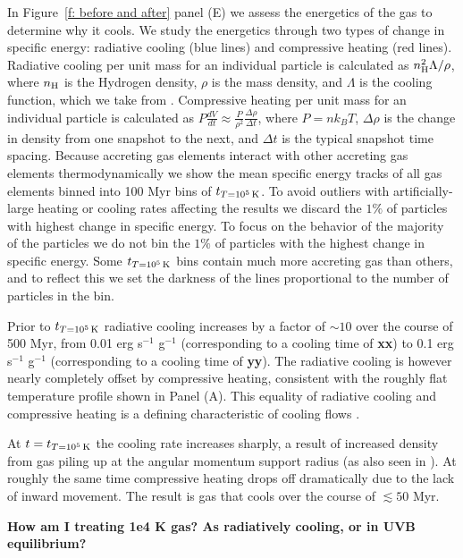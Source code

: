 \documentclass[fleqn,usenatbib]{mnras}
\newcommand{\tcon}{t_{T=10^5\,{\rm K}}}
\newcommand{\nH}{n_{\rm H}}
\begin{document}
In Figure~\ref{f: before and after} panel (E) we assess the energetics of the gas to determine why it cools.
We study the energetics through two types of change in specific energy: radiative cooling (blue lines) and compressive heating (red lines).
Radiative cooling per unit mass for an individual particle is calculated as $\nH^2 \Lambda / \rho$, where $\nH$ is the Hydrogen density, $\rho$ is the mass density, and $\Lambda$ is the cooling function, which we take from \cite{Wiersma2009a}.
Compressive heating per unit mass for an individual particle is calculated as $P \frac{dV}{dt} \approx \frac{ P }{ \rho^2 } \frac{ \Delta \rho }{ \Delta t }$, where $P = n k_B T$, $\Delta \rho$ is the change in density from one snapshot to the next, and $\Delta t$ is the typical snapshot time spacing.
Because accreting gas elements interact with other accreting gas elements thermodynamically we show the mean specific energy tracks of all gas elements binned into 100 Myr bins of $\tcon$.
To avoid outliers with artificially-large heating or cooling rates affecting the results we discard the $1\%$ of particles with highest change in specific energy.
To focus on the behavior of the majority of the particles we do not bin the $1\%$ of particles with the highest change in specific energy.
Some $\tcon$ bins contain much more accreting gas than others, and to reflect this we set the darkness of the lines proportional to the number of particles in the bin.

Prior to $\tcon$ radiative cooling increases by a factor of $\sim 10$ over the course of 500 Myr, from 0.01 erg s$^{-1}$ g$^{-1}$ (corresponding to a cooling time of \textbf{xx}) to 0.1 erg s$^{-1}$ g$^{-1}$ (corresponding to a cooling time of \textbf{yy}).
The radiative cooling is however nearly completely offset by compressive heating, consistent with the roughly flat temperature profile shown in Panel (A).
This equality of radiative cooling and compressive heating is a defining characteristic of cooling flows \citep{Mathews78, McNamara2007, Stern20}. 

At $t=\tcon$ the cooling rate increases sharply, a result of increased density from gas piling up at the angular momentum support radius (as also seen in \citealt{Trapp2021}).
At roughly the same time compressive heating drops off dramatically due to the lack of inward movement.
The result is gas that cools over the course of $\lesssim 50$ Myr.

\textbf{
How am I treating 1e4 K gas?
As radiatively cooling, or in UVB equilibrium?
}
\end{document}
